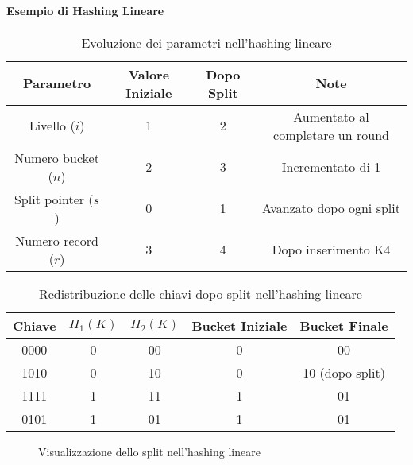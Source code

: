 \paragraph{Esempio di Hashing Lineare}
\begin{table}[h]
\centering
\begin{tabular}{|c|c|c|c|}
\hline
\textbf{Parametro} & \textbf{Valore Iniziale} & \textbf{Dopo Split} & \textbf{Note} \\
\hline
Livello ($i$) & 1 & 2 & Aumentato al completare un round \\
\hline
Numero bucket ($n$) & 2 & 3 & Incrementato di 1 \\
\hline
Split pointer ($s$) & 0 & 1 & Avanzato dopo ogni split \\
\hline
Numero record ($r$) & 3 & 4 & Dopo inserimento K4 \\
\hline
\end{tabular}
\caption{Evoluzione dei parametri nell'hashing lineare}
\end{table}

\begin{table}[h]
\centering
\begin{tabular}{|c|c|c|c|c|}
\hline
\textbf{Chiave} & \textbf{$H_1(K)$} & \textbf{$H_2(K)$} & \textbf{Bucket Iniziale} & \textbf{Bucket Finale} \\
\hline
0000 & 0 & 00 & 0 & 00 \\
\hline
1010 & 0 & 10 & 0 & 10 (dopo split) \\
\hline
1111 & 1 & 11 & 1 & 01 \\
\hline
0101 & 1 & 01 & 1 & 01 \\
\hline
\end{tabular}
\caption{Redistribuzione delle chiavi dopo split nell'hashing lineare}
\end{table}

\begin{figure}[h]
\centering
{}
\caption{Visualizzazione dello split nell'hashing lineare}
\end{figure}

